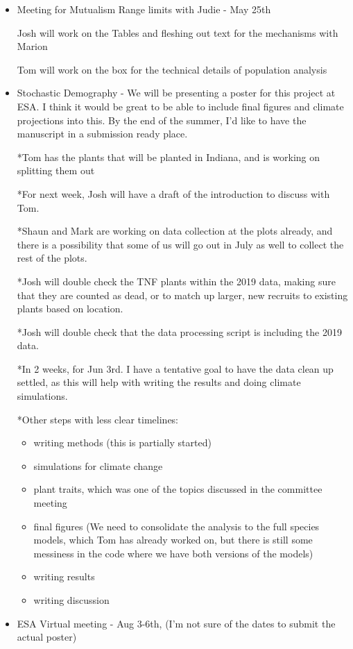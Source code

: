 \documentclass{article}
\begin{document}
\begin{itemize}
\item{Meeting for Mutualism Range limits with Judie - May 25th}

Josh will work on the Tables and fleshing out text for the mechanisms with Marion

Tom will work on the box for the technical details of population analysis

\item{Stochastic Demography - We will be presenting a poster for this project at ESA. I think it would be great to be able to include final figures and climate projections into this. By the end of the summer, I'd like to have the manuscript in a submission ready place.}

*Tom has the plants that will be planted in Indiana, and is working on splitting them out

*For next week, Josh will have a draft of the introduction to discuss with Tom.

*Shaun and Mark are working on data collection at the plots already, and there is a possibility that some of us will go out in July as well to collect the rest of the plots.


*Josh will double check the TNF plants within the 2019 data, making sure that they are counted as dead, or to match up larger, new recruits to existing plants based on location.

*Josh will double check that the data processing script is including the 2019 data.

*In 2 weeks, for Jun 3rd. I have a tentative goal to have the data clean up settled, as this will help with writing the results and doing climate simulations.

*Other steps with less clear timelines:
\begin{itemize}
\item{writing methods (this is partially started)}
\item{simulations for climate change}
\item{plant traits, which was one of the topics discussed in the committee meeting}
\item{final figures (We need to consolidate the analysis to the full species models, which Tom has already worked on, but there is still some messiness in the code where we have both versions of the models)}
\item{writing results}
\item{writing discussion}
\end{itemize}

\item{ESA Virtual meeting - Aug 3-6th, (I'm not sure of the dates to submit the actual poster)}

\end{itemize}
\end{document}
